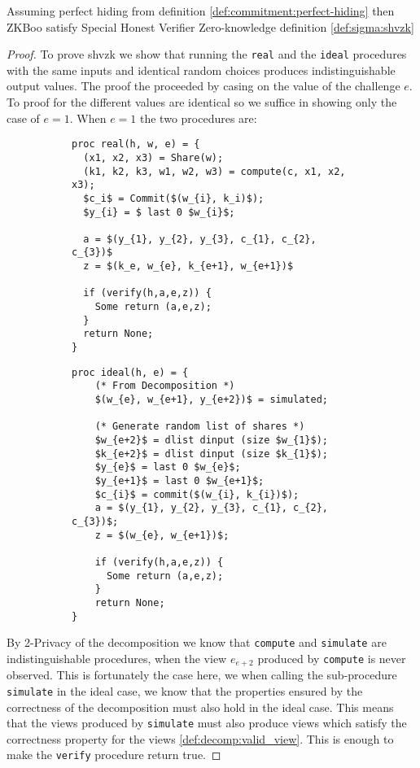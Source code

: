 \begin{lemma}
  Assuming perfect hiding from definition \ref{def:commitment:perfect-hiding} then ZKBoo satisfy Special Honest Verifier Zero-knowledge definition \ref{def:sigma:shvzk}
\end{lemma}
\begin{proof}
  To prove shvzk we show that running the \texttt{real} and the \texttt{ideal}
  procedures with the same inputs and identical random choices produces
  indistinguishable output values. The proof the proceeded by casing on the
  value of the challenge $e$. To proof for the different values are identical so
  we suffice in showing only the case of $e=1$. When $e=1$ the two procedures
  are:

  \begin{figure}[ht]
    \centering
    \begin{subfigure}{0.48\textwidth }
    \begin{lstlisting}[mathescape]
proc real(h, w, e) = {
  (x1, x2, x3) = Share(w);
  (k1, k2, k3, w1, w2, w3) = compute(c, x1, x2, x3);
  $c_i$ = Commit($(w_{i}, k_i)$);
  $y_{i} = $ last 0 $w_{i}$;

  a = $(y_{1}, y_{2}, y_{3}, c_{1}, c_{2}, c_{3})$
  z = $(k_e, w_{e}, k_{e+1}, w_{e+1})$

  if (verify(h,a,e,z)) {
    Some return (a,e,z);
  }
  return None;
}
    \end{lstlisting}
    \end{subfigure}
    \hfill
    \begin{subfigure}{ 0.48\textwidth }
    \begin{lstlisting}[mathescape]
proc ideal(h, e) = {
    (* From Decomposition *)
    $(w_{e}, w_{e+1}, y_{e+2})$ = simulated;

    (* Generate random list of shares *)
    $w_{e+2}$ = dlist dinput (size $w_{1}$);
    $k_{e+2}$ = dlist dinput (size $k_{1}$);
    $y_{e}$ = last 0 $w_{e}$;
    $y_{e+1}$ = last 0 $w_{e+1}$;
    $c_{i}$ = commit($(w_{i}, k_{i})$);
    a = $(y_{1}, y_{2}, y_{3}, c_{1}, c_{2}, c_{3})$;
    z = $(w_{e}, w_{e+1})$;

    if (verify(h,a,e,z)) {
      Some return (a,e,z);
    }
    return None;
}
    \end{lstlisting}
    \end{subfigure}
  \end{figure}

  By 2-Privacy of the decomposition we know that \texttt{compute} and
  \texttt{simulate} are indistinguishable procedures, when the view $e_{e+2}$
  produced by \texttt{compute} is never observed. This is fortunately the case
  here, we when calling the sub-procedure \texttt{simulate} in the ideal case,
  we know that the properties ensured by the correctness of the decomposition
  must also hold in the ideal case. This means that the views produced by
  \texttt{simulate} must also produce views which satisfy the correctness
  property for the views \ref{def:decomp:valid_view}.
  This is enough to make the \texttt{verify} procedure return true.


\end{proof}
